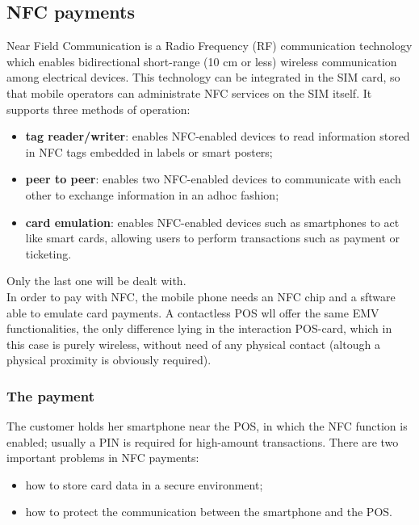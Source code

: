\documentclass[a4paper, 10pt, titlepage]{article}
\begin{document}
\subsection{NFC payments}
Near Field Communication is a Radio Frequency (RF) communication technology which enables bidirectional short-range (10 cm or less) wireless communication among electrical devices. This technology can be integrated in the SIM card, so that mobile operators can administrate NFC services on the SIM itself. It supports three methods of operation: 
\begin{itemize}
\item \textbf{tag reader/writer}: enables NFC-enabled devices to read information stored in NFC tags embedded in labels or smart posters;
\item \textbf{peer to peer}: enables two NFC-enabled devices to communicate with each other to exchange information in an adhoc fashion;
\item \textbf{card emulation}: enables NFC-enabled devices such as smartphones to act like smart cards, allowing users to perform transactions such as payment or ticketing.
\end{itemize}
Only the last one will be dealt with. \medskip\\
In order to pay with NFC, the mobile phone needs an NFC chip and a sftware able to emulate card payments. A contactless POS wll offer the same EMV functionalities, the only difference lying in the interaction POS-card, which in this case is purely wireless, without need of any physical contact (altough a physical proximity is obviously required).

\subsubsection{The payment}
The customer holds her smartphone near the POS, in which the NFC function is enabled; usually a PIN is required for high-amount transactions. There are two important problems in NFC payments:
\begin{itemize}
\item how to store card data in a secure environment;
\item how to protect the communication between the smartphone and the POS.
\end{itemize}
\end{document}
